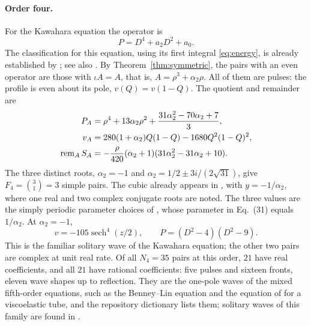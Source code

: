 \paragraph{Order four.}
For the Kawahara equation
\citep{Kawahara1972,DeminaKudryashovKawahara2010} the operator is
\begin{equation}\label{eq:kawahara-P}
 P=D^4+a_2D^2+a_0.
\end{equation}
The classification for this equation, using its first integral
\eqref{eq:energy}, is already established by
\citet{DeminaKudryashovKawahara2010}; see also \citet{YeEtAl2022}. By
Theorem~\ref{thm:symmetric}, the pairs with an even operator are those
with \(\iota A=A\), that is, \(A=\rho^3+\alpha_2\rho\). All of them
are pulses: the profile is even about its pole, \(v(Q)=v(1-Q)\). The
quotient and remainder are
\begin{equation}\label{eq:kawahara-exponential}
 \begin{split}
 P_A&=\rho^4+13\alpha_2\rho^2+\frac{31\alpha_2^2-70\alpha_2+7}{3},\\
 v_A&=280(1+\alpha_2)Q(1-Q)-1680Q^2(1-Q)^2,\\
 \operatorname{rem}_{A} S_A
   &=-\frac{\rho}{420}(\alpha_2+1)(31\alpha_2^2-31\alpha_2+10).
 \end{split}
\end{equation}
The three distinct roots, \(\alpha_2=-1\) and
\(\alpha_2=1/2\pm3i/(2\sqrt{31})\), give \(F_4=\binom31=3\) simple
pairs. The cubic already appears in \citet[Eq.~(47)]{Kudryashov1989},
with \(y=-1/\alpha_2\), where one real and two complex conjugate roots
are noted. The three values are the simply periodic parameter choices
of \citet[Section~3]{DeminaKudryashovKawahara2010}, whose parameter in
Eq.~(31) equals \(1/\alpha_2\). At \(\alpha_2=-1\),
\begin{equation}\label{eq:kawahara-soliton}
 v=-105\operatorname{sech}^4(z/2),\qquad
 P=(D^2-4)(D^2-9).
\end{equation}
This is the familiar solitary wave of the Kawahara equation; the other
two pairs are complex at unit real rate. Of all \(N_4=35\) pairs at
this order, \(21\) have real coefficients, and all \(21\) have rational
coefficients: five pulses and sixteen fronts, eleven wave shapes up to
reflection. They are the one-pole waves of the mixed fifth-order
equations, such as the Benney--Lin equation and the equation of
\citet{KudryashovSinelshchikov2011} for a viscoelastic tube, and the
repository dictionary lists them; solitary waves of this family are
found in \citet{KudryashovDemina2009}.

